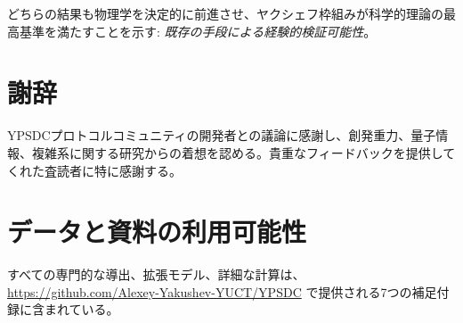 \documentclass[11pt,a4paper]{article}
\begin{document}
	どちらの結果も物理学を決定的に前進させ、ヤクシェフ枠組みが科学的理論の最高基準を満たすことを示す: \emph{既存の手段による経験的検証可能性}。
	
	\section*{謝辞}
	YPSDCプロトコルコミュニティの開発者との議論に感謝し、創発重力、量子情報、複雑系に関する研究からの着想を認める。貴重なフィードバックを提供してくれた査読者に特に感謝する。
	
	\section*{データと資料の利用可能性}
	すべての専門的な導出、拡張モデル、詳細な計算は、\url{https://github.com/Alexey-Yakushev-YUCT/YPSDC} で提供される7つの補足付録に含まれている。
	
\end{document}
